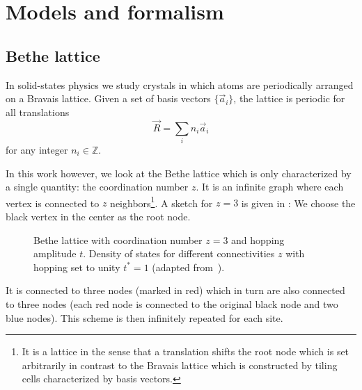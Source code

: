 
\chapter{Models and formalism}%
\label{ch:models-and-formalism}

\section{Bethe lattice}

In solid-states physics we study crystals in which
atoms are periodically arranged on a Bravais lattice.
Given a set of basis vectors $\{\vec{a}_i\}$,
the lattice is periodic for all translations
\begin{equation}
    \vec{R} = \sum_i n_i \vec{a}_i
\end{equation}
for any integer $n_i \in \mathbb{Z}$.

In this work however,
we look at the Bethe lattice which is only characterized by a single quantity:
the coordination number $z$.
It is an infinite graph where each vertex is connected to $z$ neighbors\footnote{
    It is a lattice in the sense that a translation shifts the root node which is set arbitrarily
    in contrast to the Bravais lattice which is constructed by tiling cells characterized
    by basis vectors.
}.
A sketch for $z=3$ is given in :
We choose the black vertex in the center as the root node.
\begin{figure}[ht]
    \centering
    \begin{subfigure}{0.45\textwidth}
        \centering
        
        \caption{}%
        \label{subfig:bethe-lattice}
    \end{subfigure}
    \begin{subfigure}{0.45\textwidth}
        \centering
        
        \caption{}%
        \label{subfig:bethe-density}
    \end{subfigure}
    \caption{
        Bethe lattice with coordination number $z=3$ and hopping amplitude $t$.
        Density of states for different connectivities $z$ with hopping set to unity $t^*=1$
        (adapted from~\cite{Wallerberger2016}).
    }
\end{figure}
It is connected to three nodes (marked in red) which in turn are also connected
to three nodes (each red node is connected to the original black node and two blue nodes).
This scheme is then infinitely repeated for each site.

